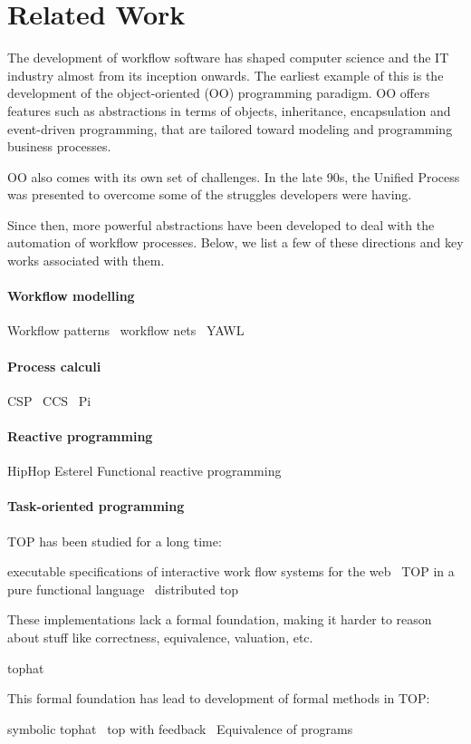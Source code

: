 
\section{Related Work}
\label{sec:relatedwork}

The development of workflow software has shaped computer science and the IT industry almost from its inception onwards.
The earliest example of this is the development of the object-oriented (OO) programming paradigm.
OO offers features such as abstractions in terms of objects, inheritance, encapsulation and event-driven programming, that are tailored toward modeling and programming business processes.

OO also comes with its own set of challenges.
In the late 90s, the Unified Process was presented to overcome some of the struggles developers were having.

Since then, more powerful abstractions have been developed to deal with the automation of workflow processes.
Below, we list a few of these directions and key works associated with them.

\paragraph{Workflow modelling}
Workflow patterns~\cite{journals/dpd/AalstHKB03}
workflow nets~\cite{journals/infsof/LassenA09,journals/jcsc/Aalst98}
YAWL~\cite{journals/is/AalstH05}

\paragraph{Process calculi}
CSP~\cite{books/ph/Hoare85}
CCS~\cite{books/ph/Milner89}
Pi~\cite{DBLP:books/daglib/0098267}

\paragraph{Reactive programming}
HipHop
Esterel
Functional reactive programming

\paragraph{Task-oriented programming}

TOP has been studied for a long time:

executable specifications of interactive work flow systems for the web~\cite{conf/icfp/PlasmeijerAK07}
TOP in a pure functional language~\cite{conf/ppdp/PlasmeijerLMAK12}
distributed top~\cite{conf/ifl/OortgieseGAP17}

These implementations lack a formal foundation, making it harder to reason about stuff like correctness, equivalence, valuation, etc.

tophat~\cite{conf/ppdp/SteenvoordenNK19}

This formal foundation has lead to development of formal methods in TOP:

symbolic tophat~\cite{conf/ifl/NausSK19}
top with feedback~\cite{conf/sfp/NausS20}
Equivalence of programs~\cite{conf/sfp/KlijnsmaS22}